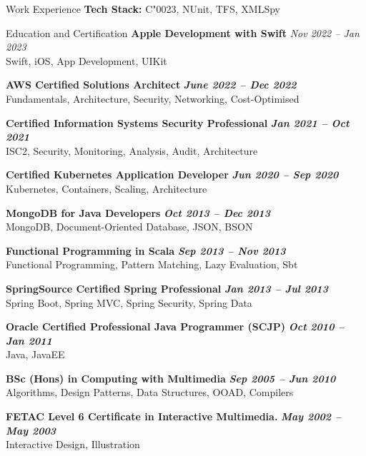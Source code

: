 \documentclass{résumé}
\begin{document}
\begin{rSection}{Work Experience}
\textbf{Tech Stack:} \normalfont C\char"0023, NUnit, TFS, XMLSpy \\

\begin{rSection}{Education and Certification}
{\bf Apple Development with Swift} \hfill {\em Nov 2022 – Jan 2023} 
\\ \normalfont Swift, iOS, App Development, UIKit

{\bf AWS Certified Solutions Architect} \hfill {\em \textbf{June 2022 – Dec 2022}} 
\\ \normalfont Fundamentals, Architecture, Security, Networking, Cost-Optimised

{\bf Certified Information Systems Security Professional} \hfill {\em \textbf{Jan 2021 – Oct 2021}} 
\\ \normalfont ISC2, Security, Monitoring, Analysis, Audit, Architecture

{\bf Certified Kubernetes Application Developer} \hfill {\em \textbf{Jun 2020 – Sep 2020}} 
\\ \normalfont Kubernetes, Containers, Scaling, Architecture

{\bf MongoDB for Java Developers} \hfill {\em \textbf{Oct 2013 – Dec 2013}} 
\\ \normalfont MongoDB, Document-Oriented Database, JSON, BSON

{\bf Functional Programming in Scala} \hfill {\em \textbf{Sep 2013 – Nov 2013}} 
\\ \normalfont Functional Programming, Pattern Matching, Lazy Evaluation, Sbt

{\bf SpringSource Certified Spring Professional} \hfill {\em \textbf{Jan 2013 – Jul 2013}} 
\\ \normalfont Spring Boot, Spring MVC, Spring Security, Spring Data

{\bf Oracle Certified Professional Java Programmer (SCJP)} \hfill {\em \textbf{Oct 2010 – Jan 2011}} 
\\ \normalfont Java, JavaEE

{\bf BSc (Hons) in Computing with Multimedia} \hfill {\em \textbf{Sep 2005 – Jun 2010}} 
\\ \normalfont Algorithms, Design Patterns, Data Structures, OOAD,
Compilers

{\bf FETAC Level 6 Certificate in Interactive Multimedia.} \hfill {\em \textbf{May 2002 – May 2003}} 
\\ \normalfont Interactive Design, Illustration
\end{rSection}
\pagebreak


\end{rSection}
\end{document}
